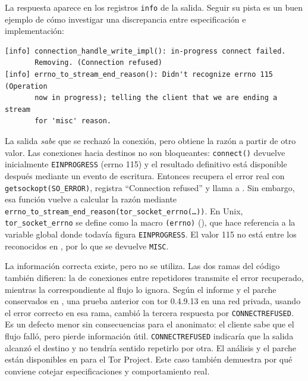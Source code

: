 \begin{approfondimento}
La respuesta aparece en los registros \texttt{info} de la salida. Seguir su pista es un buen ejemplo de cómo investigar una discrepancia entre especificación e implementación:
\begin{lstlisting}[numbers=none]
[info] connection_handle_write_impl(): in-progress connect failed.
       Removing. (Connection refused)
[info] errno_to_stream_end_reason(): Didn't recognize errno 115 (Operation
       now in progress); telling the client that we are ending a stream
       for 'misc' reason.
\end{lstlisting}

La salida \emph{sabe} que se rechazó la conexión, pero obtiene la razón a partir de otro valor. Las conexiones hacia destinos no son bloqueantes: \texttt{connect()} devuelve inicialmente \texttt{EINPROGRESS} (errno 115) y el resultado definitivo está disponible después mediante un evento de escritura. Entonces  recupera el error real con \texttt{getsockopt(SO\_ERROR)}, registra \enquote{Connection refused} y llama a . Sin embargo, esa función vuelve a calcular la razón mediante \texttt{errno\_to\_stream\_end\_reason(tor\_socket\_errno(\ldots))}. En Unix, \texttt{tor\_socket\_errno} se define como la macro \texttt{(errno)} (), que hace referencia a la variable global donde todavía figura \texttt{EINPROGRESS}. El valor 115 no está entre los reconocidos en , por lo que se devuelve \texttt{MISC}.

La información correcta existe, pero no se utiliza. Las dos ramas del código también difieren: la de conexiones entre repetidores transmite el error recuperado, mientras la correspondiente al flujo lo ignora. Según el informe y el parche conservados en , una prueba anterior con tor 0.4.9.13 en una red privada, usando el error correcto en esa rama, cambió la tercera respuesta por \texttt{CONNECTREFUSED}. Es un defecto menor sin consecuencias para el anonimato: el cliente sabe que el flujo falló, pero pierde información útil. \texttt{CONNECTREFUSED} indicaría que la salida alcanzó el destino y no tendría sentido repetirlo por otra. El análisis y el parche están disponibles en  para el Tor Project. Este caso también demuestra por qué conviene cotejar especificaciones y comportamiento real.
\end{approfondimento}

